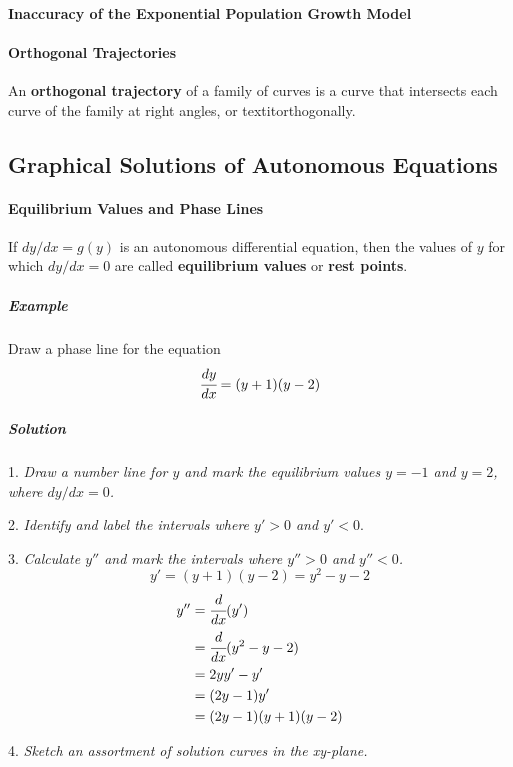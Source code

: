 \documentclass{article}
\begin{document}
            \paragraph{Inaccuracy of the Exponential Population Growth Model}
            \paragraph{Orthogonal Trajectories}
            An \textbf{orthogonal trajectory} of a family of curves is a curve that intersects each curve of the family at right angles, or textit{orthogonally}.
        \subsection{Graphical Solutions of Autonomous Equations}
            \paragraph{Equilibrium Values and Phase Lines}
            If $dy/dx=g(y)$ is an autonomous differential equation, then the values of $y$ for which $dy/dx=0$ are called \textbf{equilibrium values} or \textbf{rest points}.
                \subparagraph{Example} Draw a phase line for the equation
                \[\cfrac{dy}{dx}=(y+1)(y-2)\]
                \subparagraph{Solution}
                \par 1. \textit{Draw a number line for $y$ and mark the equilibrium values $y=-1$ and $y=2$, where $dy/dx=0$.}
                \par 2. \textit{Identify and label the intervals where $y'>0$ and $y'<0$}.
                \par 3. \textit{Calculate $y''$ and mark the intervals where $y''>0$ and $y''<0$.}
                \[y'=(y+1)(y-2)=y^2-y-2\]
                \begin{equation}
                    \begin{aligned}
                        y''&=\cfrac{d}{dx}(y')\\
                        &=\cfrac{d}{dx}(y^2-y-2)\\
                        &=2yy'-y'\\
                        &=(2y-1)y'\\
                        &=(2y-1)(y+1)(y-2)\\
                    \end{aligned}
                \end{equation}
                \par 4. \textit{Sketch an assortment of solution curves in the xy-plane.}
\end{document}
